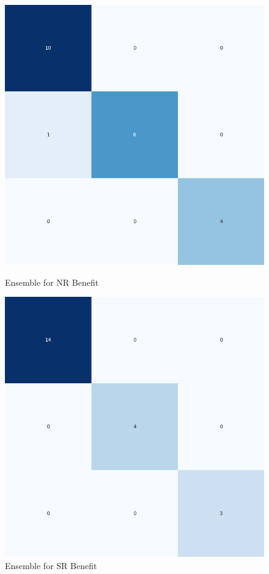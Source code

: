 \begin{figure}[H]
    \centering
    \begin{minipage}[b]{0.45\textwidth}
        \includegraphics[width=\textwidth]{./class_specificxtra_section/ensemble_plots/ensemble_confusion_matrix_NR_Benefit.png}
        \caption{Ensemble for NR Benefit}
        \label{fig_class:specxtra_ensemble_nr_benefit}
    \end{minipage}
    \hfill
    \begin{minipage}[b]{0.45\textwidth}
        \includegraphics[width=\textwidth]{./class_specificxtra_section/ensemble_plots/ensemble_confusion_matrix_SR_Benefit.png}
        \caption{Ensemble for SR Benefit}
        \label{fig_class:specxtra_ensemble_sr_benefit}
    \end{minipage}
\end{figure}

